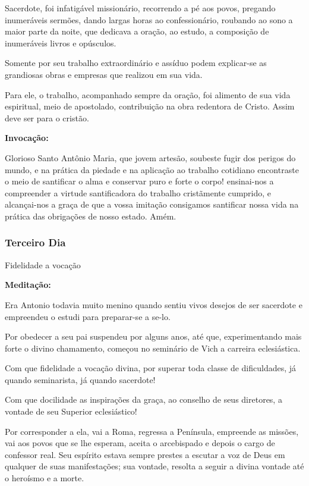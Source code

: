\documentclass[a4paper,14pt]{extarticle} \usepackage[utf8]{inputenc}
\begin{document}
Sacerdote, foi infatigável missionário, recorrendo a pé aos povos, pregando inumeráveis sermões, dando largas horas ao confessionário, roubando ao sono a maior parte da noite, que dedicava a oração, ao estudo, a composição de inumeráveis livros e opúsculos.

Somente por seu trabalho extraordinário e assíduo podem explicar-se as grandiosas obras e empresas que realizou em sua vida.

Para ele, o trabalho, acompanhado sempre da oração, foi alimento de sua vida espiritual, meio de apostolado, contribuição na obra redentora de Cristo. Assim deve ser para o cristão.

\textbf{Invocação:}

 Glorioso Santo Antônio Maria, que jovem artesão, soubeste fugir dos perigos do mundo, e na prática da piedade e na aplicação ao trabalho cotidiano encontraste o meio de santificar o alma e conservar puro e forte o corpo! ensinai-nos a compreender a virtude santificadora do trabalho cristãmente cumprido, e alcançai-nos a graça de que a vossa imitação consigamos santificar nossa vida na prática das obrigações de nosso estado. Amém.

\subsubsection{Terceiro Dia}
Fidelidade a vocação

\textbf{Meditação:}

Era Antonio todavia muito menino quando sentiu vivos desejos de ser sacerdote e empreendeu o estudi para preparar-se a se-lo.

Por obedecer a seu pai suspendeu por alguns anos, até que, experimentando mais forte o divino chamamento, começou no seminário de Vich a carreira eclesiástica.

Com que fidelidade a vocação divina, por superar toda classe de dificuldades, já quando seminarista, já quando sacerdote!

Com que docilidade as inspirações da graça, ao conselho de seus diretores, a vontade de seu Superior eclesiástico!

Por corresponder a ela, vai a Roma, regressa a Península, empreende as missões, vai aos povos que se lhe esperam, aceita o arcebispado e depois o cargo de confessor real. Seu espírito estava sempre prestes a escutar a voz de Deus em qualquer de suas manifestações; sua vontade, resolta a seguir a divina vontade até o heroísmo e a morte.
\end{document}
